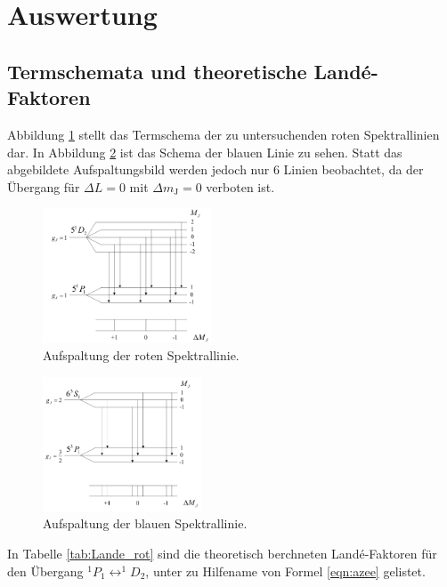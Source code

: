 \newpage
\section{Auswertung}
\label{sec:Auswertung}
\subsection{Termschemata und theoretische Landé-Faktoren}
Abbildung \ref{fig:cdrot} stellt das Termschema der zu untersuchenden roten Spektrallinien dar.
In Abbildung \ref{fig:cdblau} ist das Schema der blauen Linie zu sehen.
Statt das abgebildete Aufspaltungsbild werden jedoch nur 6 Linien beobachtet, da der Übergang für $\Delta L = 0$
mit $\Delta m_\text{J} = 0$ verboten ist.
\begin{figure}[htb]
  \centering
  \includegraphics[height=4cm]{content/pictures/cdrot.png}
  \caption{Aufspaltung der roten Spektrallinie.\cite{zeeman}}
  \label{fig:cdrot}
\end{figure}
\begin{figure}[htb]
  \centering
  \includegraphics[height=4cm]{content/pictures/cdblau.png}
  \caption{Aufspaltung der blauen Spektrallinie.\cite{zeeman}}
  \label{fig:cdblau}
\end{figure}
In Tabelle \ref{tab:Lande_rot} sind die theoretisch berchneten Landé-Faktoren für den Übergang $^1P_1 \leftrightarrow ^1\!\!D_2$,
unter zu Hilfename von Formel \eqref{eqn:azee} gelistet.
